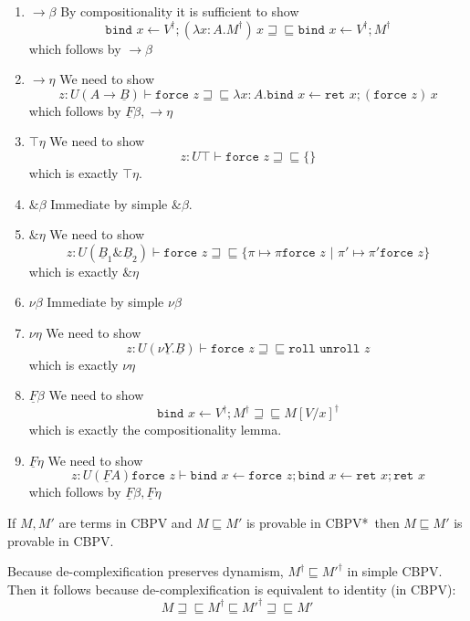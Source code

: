 \documentclass[acmsmall,screen,12pt]{acmart}
\renewcommand{\u}{\underline}
\newcommand{\cbpvstar}{CBPV*}
\newcommand{\pipe}{\,\,|\,\,}
\newcommand{\ltdyn}{\sqsubseteq}
\newcommand{\gtdyn}{\sqsupseteq}
\newcommand{\equidyn}{\mathrel{\gtdyn\ltdyn}}
\newcommand{\simp}[1]{{#1}^{\dag}}
\newcommand{\pair}[2]{\{ \pi \mapsto {#1} \pipe \pi' \mapsto {#2}\}}
\newcommand{\roll}{\kw{roll}}
\newcommand{\unroll}{\kw{unroll}}
\newcommand{\bindXtoYinZ}[2]{\kw{bind}#2 \leftarrow #1;}
\newcommand{\kw}[1]{\texttt{#1}\,\,}
\newcommand{\ret}{\kw{ret}}
\newcommand{\thunk}{\kw{thunk}}
\newcommand{\force}{\kw{force}}
\newcommand{\with}{\mathbin{\&}}
\begin{document}
{\begin{longonly}
\begin{longproof}
\begin{enumerate}
    By compositionality it is sufficient to show
    \[ \simp V \equidyn \bindXtoYinZ {\simp V} x \ret\thunk{(\bindXtoYinZ {\ret x} x \force x)}\]
    which follows by $U\eta$ and some simple reductions:
    \begin{align*}
      \bindXtoYinZ {\simp V} x \ret\thunk{(\bindXtoYinZ {\ret x} x \force x)}\\
      &\equidyn \bindXtoYinZ {\simp V} x\ret\thunk{\force x}\tag{$\u F\beta$}\\
      &\equidyn \bindXtoYinZ {\simp V} x\ret x\tag{$U\eta$}\\
      &\equidyn \simp V\tag{$\u F\eta$}
    \end{align*}
  \item $\to\beta$
    By compositionality it is sufficient to show
    \[ \bindXtoYinZ {\simp V} x (\lambda x:A. \simp M)\,x
    \equidyn \bindXtoYinZ {\simp V} x \simp M \]
    which follows by $\to\beta$
  \item $\to\eta$ We need to show
    \[ z : U(A \to \u B) \vdash
    \force z \equidyn
    \lambda x:A. \bindXtoYinZ {\ret x} x (\force z)\,x
    \]
    which follows by $\u F\beta, \to\eta$
  \item $\top\eta$ We need to show
    \[ z : U\top \vdash \force z \equidyn \{\} \]
    which is exactly $\top\eta$.
  \item $\with\beta$ Immediate by simple $\with\beta$.
  \item $\with\eta$ We need to show
    \[ z : U(\u B_1\with\u B_2) \vdash \force z \equidyn \pair{\pi\force z}{\pi'\force z}\]
    which is exactly $\with\eta$
  \item $\nu\beta$ Immediate by simple $\nu\beta$
  \item $\nu\eta$ We need to show
    \[ z : U(\nu \u Y. \u B) \vdash \force z \equidyn \roll\unroll z \]
    which is exactly $\nu\eta$
  \item $\u F\beta$
    We need to show
    \[ \bindXtoYinZ {\simp V} x \simp M \equidyn \simp{M[V/x]}\]
    which is exactly the compositionality lemma.
  \item $\u F\eta$ We need to show
    \[ z : U(\u F A)\force z \vdash \bindXtoYinZ {\force z} x \bindXtoYinZ {\ret x} x \ret x \]
    which follows by $\u F\beta,\u F\eta$
  \end{enumerate}
\end{longproof}

\begin{theorem}
  If $M, M'$ are terms in CBPV and $M \ltdyn M'$ is provable in \cbpvstar\ 
  then $M \ltdyn M'$ is provable in CBPV.
\end{theorem}
\begin{longproof}
  Because de-complexification preserves dynamism, $\simp M \ltdyn
  \simp{M'}$ in simple CBPV. Then it follows because
  de-complexification is equivalent to identity (in CBPV):
  \[ M \equidyn \simp M \ltdyn \simp {M'} \equidyn M' \]
\end{longproof}
\end{longonly}

}
\end{document}
